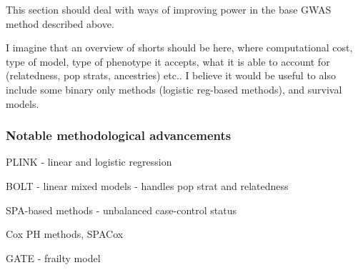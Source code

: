 This section should deal with ways of improving power in the base GWAS method described above.

I imagine that an overview of shorts should be here, where computational cost, type of model, type of phenotype it accepts, what it is able to account for (relatedness, pop strats, ancestries) etc.. I believe it would be useful to also include some binary only methods (logistic reg-based methods), and survival models.


\subsubsection{Notable methodological advancements}

\begin{enumerate*}
	\item PLINK - linear and logistic regression
	\item BOLT - linear mixed models - handles pop strat and relatedness
	\item SPA-based methods - unbalanced case-control status
	\item Cox PH methods, SPACox
	\item GATE - frailty model
\end{enumerate*}


